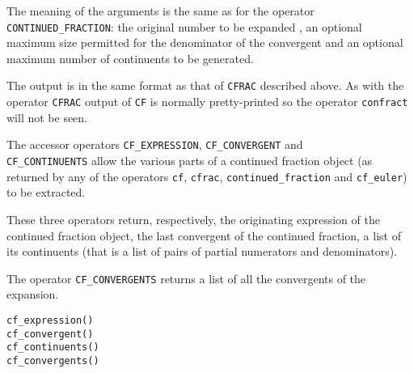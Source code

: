 The meaning of the arguments is the same as for the operator
\texttt{CONTINUED\_FRACTION}: the original number to be expanded
, an optional maximum size  permitted for the
denominator of the convergent and an optional maximum number of continuents
 to be generated.

The output is in the same format as that of \texttt{CFRAC} described above.
As with the operator \texttt{CFRAC} output of \texttt{CF} is normally
pretty-printed so the operator \texttt{confract} will not be seen.

\hypertarget{CF_EXPRESSION:operator}{}
\hypertarget{CF_cONTINUENTS:operator}{}
\hypertarget{CF_CONVERGENT:operator}{}
\hypertarget{CF_CONVERGENTS:operator}{}

The accessor operators \texttt{CF\_EXPRESSION},
\texttt{CF\_CONVERGENT}  and \\ 
\texttt{CF\_CONTINUENTS}  allow
the various parts of a continued fraction object 
(as returned by any of the operators \texttt{cf}, \texttt{cfrac},
\texttt{continued\_fraction} and \texttt{cf\_euler}) to be extracted.

These three operators return, respectively, the originating
expression of the continued fraction object, the last convergent of the
continued fraction, a list of its continuents
(that is a list of pairs of partial numerators and denominators).

The operator \texttt{CF\_CONVERGENTS} 
returns a list of all the convergents of the expansion.
\begin{syntaxtable}
  \texttt{cf\_expression(}\texttt{)} \\
  \texttt{cf\_convergent(}\texttt{)} \\
  \texttt{cf\_continuents(}\texttt{)} \\
  \texttt{cf\_convergents(}\texttt{)} 
\end{syntaxtable}

